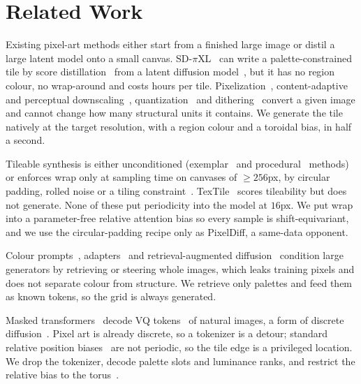 \documentclass{article}
\begin{document}
\section{Related Work}
\label{sec:related}

Existing pixel-art methods either start from a finished large image or
distil a large latent model onto a small canvas. SD-$\pi$XL~\citep{binninger2024sdpixl}
can write a palette-constrained tile by score
distillation~\citep{poole2023dreamfusion} from a latent diffusion
model~\citep{rombach2022ldm}, but it has no region colour, no wrap-around
and costs hours per tile. Pixelization~\citep{gerstner2012pixelated,wu2022pixelization},
content-adaptive and perceptual
downscaling~\citep{kopf2013downscaling,oztireli2015downscaling},
quantization~\citep{heckbert1982quantization} and dithering~\citep{floyd1976}
convert a given image and cannot change how many structural units it
contains. We generate the tile natively at the target resolution, with a
region colour and a toroidal bias, in half a second.

Tileable synthesis is either unconditioned
(exemplar~\citep{efros1999texture,efros2001quilting,gatys2015texture} and
procedural~\citep{perlin1985,worley1996} methods) or enforces wrap only at
sampling time on canvases of $\geq256$px, by circular padding, rolled noise
or a tiling constraint~\citep{zhou2022tilegen,vecchio2024controlmat,madar2025tiled}.
TexTile~\citep{rodriguezpardo2024textile} scores tileability but does not
generate. None of these put periodicity into the model at $16$px. We put
wrap into a parameter-free relative attention bias so every sample is
shift-equivariant, and we use the circular-padding recipe only as
PixelDiff, a same-data opponent.

Colour prompts~\citep{butt2024colorpeel}, adapters~\citep{zhang2023controlnet}
and retrieval-augmented
diffusion~\citep{blattmann2022rdm,sheynin2023knndiffusion,chen2023reimagen}
condition large generators by retrieving or steering whole images, which
leaks training pixels and does not separate colour from structure. We
retrieve only palettes and feed them as known tokens, so the grid is always
generated.

Masked transformers~\citep{chang2022maskgit,chang2023muse,lezama2022tokencritic,li2023mage,weber2024maskbit}
decode VQ tokens~\citep{vandenoord2017vqvae} of natural images, a form of
discrete diffusion~\citep{austin2021d3pm}. Pixel art is already discrete, so
a tokenizer is a detour; standard relative position
biases~\citep{shaw2018relative,raffel2020t5,liu2021swin,wu2021irpe} are not
periodic, so the tile edge is a privileged location. We drop the tokenizer,
decode palette slots and luminance ranks, and restrict the relative bias to
the torus~\citep{cohen2016gcnn}.
\end{document}
